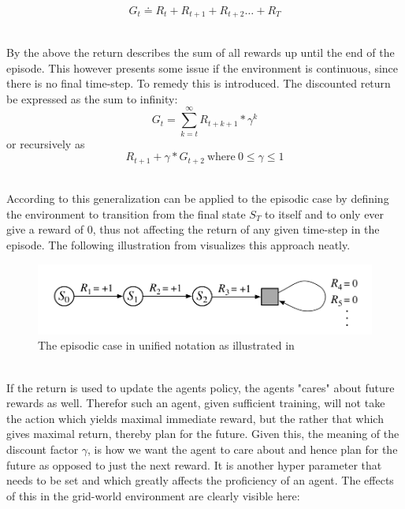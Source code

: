 \begin{equation}\label{MDP:return}
    G_t \doteq R_t + R_{t+1} + R_{t+2} \dots + R_T
\end{equation}
\centerline{\small{}}

\noindent
\\ By the above the return describes the sum of all rewards up until the end of the episode. This however presents some issue if the environment is continuous, since there is no final time-step. To remedy this  is introduced.  The discounted return be expressed as the sum to infinity:
\begin{equation}\label{MDP:discounted_return}
    G_t = \sum_{k=t}^{\infty} R_{t+k+1} * \gamma ^k 
\end{equation}
or recursively as
\begin{equation}\label{MDP:recursive_discounted_return}
    R_{t+1} + \gamma *G_{t+2} \mathrm{\ where\ } 0 \leq \gamma \leq 1
\end{equation}
\centerline{\small{}}

\noindent
\\ According to  this generalization can be applied to the episodic case by defining the environment to transition from the final state $S_T$ to itself and to only ever give a reward of 0, thus not affecting the return of any given time-step in the episode. The following illustration from  visualizes this approach neatly.

\begin{figure}[h!]
    \centering
    \includegraphics[width=0.6\linewidth]{figures/unified_notation_from_book.png}
    \caption{The episodic case in unified notation as illustrated in }
    \label{fig:unified_continuous_episodic_return}
\end{figure}

\noindent
\\ If the return is used to update the agents policy, the agents "cares" about future rewards as well. Therefor such an agent, given sufficient training, will not take the action which yields maximal immediate reward, but the rather that which gives maximal return, thereby plan for the future. Given this, the meaning of the discount factor $\gamma$, is how we want the agent to care about and hence plan for the future as opposed to just the next reward. It is another hyper parameter that needs to be set and which greatly affects the proficiency of an agent. The effects of this in the grid-world environment are clearly visible here:

